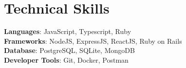 
\section{{\textcolor{mainHeading}{Technical Skills}}}
 \begin{itemize}[leftmargin=0.15in, label={}]
    \small{\item{

     \textbf{Languages}{: JavaScript, Typescript, Ruby} \\

     \textbf{Frameworks}{: NodeJS, ExpressJS, ReactJS, Ruby on Rails} \\

     \textbf{Database}{: PostgreSQL, SQLite, MongoDB} \\

     \textbf{Developer Tools}{: Git, Docker, Postman} \\

    }}
 \end{itemize}
